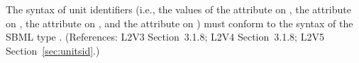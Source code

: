 The syntax of unit identifiers (i.e., the values of the 
attribute on \UnitDefinition, the  attribute on \Compartment,
the  attribute on \Parameter, and the 
attribute on \Species) must conform to the syntax of the SBML type
.  (References: L2V3 Section~3.1.8; L2V4 Section~3.1.8; L2V5 Section~\ref{sec:unitsid}.)
